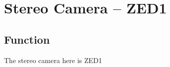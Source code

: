 \setchapterpreamble[u]{\margintoc}
\chapter{Stereo Camera -- ZED1}

\section{Function}
The stereo camera here is ZED1